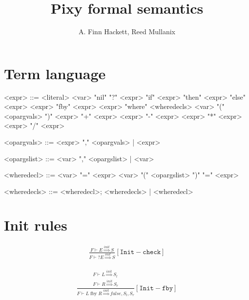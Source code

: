 \documentclass{scrartcl}
\DeclareMathOperator{\fby}{fby}
\begin{document}
    \title{Pixy formal semantics}
    \author{A. Finn Hackett, Reed Mullanix}
    \maketitle
    
    \section{Term language}
    
    \begin{grammar}
        <expr> ::= <literal>
            \alt <var>
            \alt "nil"
            \alt "?" <expr>
            \alt "if" <expr> "then" <expr> "else" <expr>
            \alt <expr> "fby" <expr>
            \alt <expr> "where" <wheredecls>
            \alt <var> "(" <opargvals> ")"
            \alt <expr> "+" <expr>
            \alt <expr> "-" <expr>
            \alt <expr> "*" <expr>
            \alt <expr> "/" <expr>
        
        <opargvals> ::= <expr> "," <opargvals> | <expr>
        
        <opargslist> ::= <var> "," <opargslist> | <var>
        
        <wheredecl> ::= <var> "=" <expr> 
            \alt <var> "(" <opargslist> ")" "=" <expr>
            
        <wheredecls> ::= <wheredecl>; <wheredecls> | <wheredecl>
    \end{grammar}

    \section{Init rules}
    
    \begin{align*}
    \frac{
        F \vdash E \overset{init}{\Rightarrow} S
    }{
        F \vdash ?E \overset{init}{\Rightarrow} S
    }[\mathtt{Init-check}]
    \end{align*}
    
    \begin{align*}
    \frac{
        \begin{matrix}
        F \vdash L \overset{init}{\Rightarrow} S_l \\
        F \vdash R \overset{init}{\Rightarrow} S_r
        \end{matrix}
    }{
        F \vdash L \fby R \overset{init}{\Rightarrow} false, S_l, S_r
    }[\mathtt{Init-fby}]
    \end{align*}
    
\end{document}
